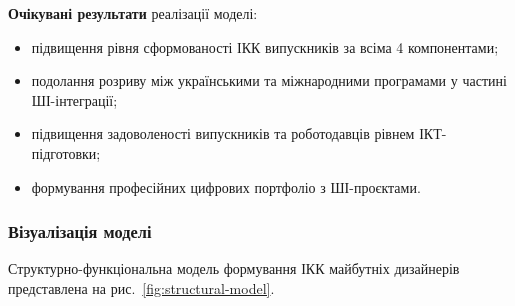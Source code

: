 \textbf{Очікувані результати} реалізації моделі:
\begin{itemize}
    \item підвищення рівня сформованості ІКК випускників за всіма 4 компонентами;
    \item подолання розриву між українськими та міжнародними програмами у частині ШІ-інтеграції;
    \item підвищення задоволеності випускників та роботодавців рівнем ІКТ-підготовки;
    \item формування професійних цифрових портфоліо з ШІ-проєктами.
\end{itemize}

\subsubsection{Візуалізація моделі}\label{sssec:3.1.6}

Структурно-функціональна модель формування ІКК майбутніх дизайнерів представлена на рис.~\ref{fig:structural-model}.

